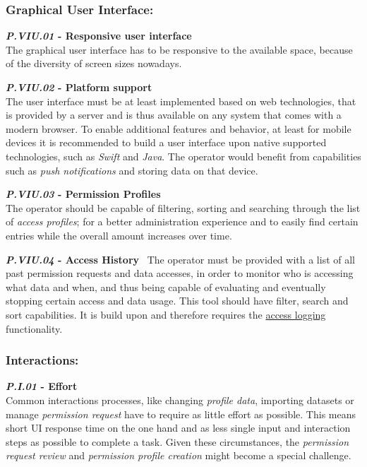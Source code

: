 \documentclass[12pt,english,a4paper,titlepage,cleardoublepage=empty,dottedtoc]{report}
\begin{document}
\subsubsection{Graphical User
Interface:}\label{graphical-user-interface}

\textbf{\emph{\protect\hypertarget{pviu01}{}{P.VIU.01}} - Responsive
user interface}\\
The graphical user interface has to be responsive to the available
space, because of the diversity of screen sizes nowadays.

\textbf{\emph{\protect\hypertarget{pviu02}{}{P.VIU.02}} - Platform
support}\\
The user interface must be at least implemented based on web
technologies, that is provided by a server and is thus available on any
system that comes with a modern browser. To enable additional features
and behavior, at least for mobile devices it is recommended to build a
user interface upon native supported technologies, such as \emph{Swift}
and \emph{Java}. The operator would benefit from capabilities such as
\emph{push notifications} and storing data on that device.

\textbf{\emph{\protect\hypertarget{pviu03}{}{P.VIU.03}} - Permission
Profiles}\\
The operator should be capable of filtering, sorting and searching
through the list of \emph{access profiles}; for a better administration
experience and to easily find certain entries while the overall amount
increases over time.

\textbf{\emph{\protect\hypertarget{pviu04}{}{P.VIU.04}} - Access
History}~ The operator must be provided with a list of all past
permission requests and data accesses, in order to monitor who is
accessing what data and when, and thus being capable of evaluating and
eventually stopping certain access and data usage. This tool should have
filter, search and sort capabilities. It is build upon and therefore
requires the \protect\hyperlink{pb01}{access logging} functionality.

\subsubsection{Interactions:}\label{interactions}

\textbf{\emph{\protect\hypertarget{pi01}{}{P.I.01}} - Effort}\\
Common interactions processes, like changing \emph{profile data},
importing datasets or manage \emph{permission request} have to require
as little effort as possible. This means short UI response time on the
one hand and as less single input and interaction steps as possible to
complete a task. Given these circumstances, the \emph{permission request
review} and \emph{permission profile creation} might become a special
challenge.
\end{document}
